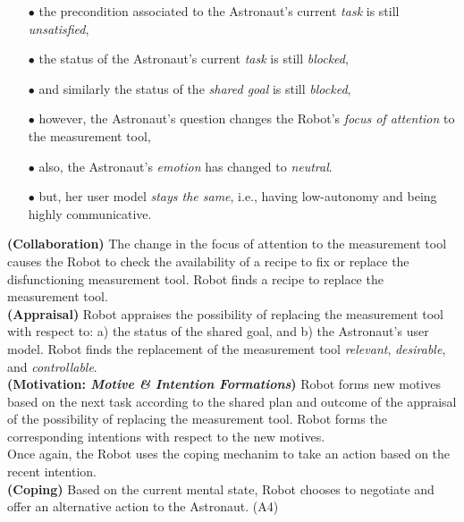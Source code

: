 \begin{itemize}
  \item[$\bullet$] the precondition associated to the Astronaut's current
  \textit{task} is still \textit{unsatisfied},
  \item[$\bullet$] the status of the Astronaut's current \textit{task} is still
  \textit{blocked},
  \item[$\bullet$] and similarly the status of the \textit{shared goal} is
  still \textit{blocked},
  \item[$\bullet$] however, the Astronaut's question changes the Robot's
  \textit{focus of attention} to the measurement tool,
  \item[$\bullet$] also, the Astronaut's \textit{emotion} has changed to
  \textit{neutral}.
  \item[$\bullet$] but, her user model \textit{stays the same}, i.e.,
  having low-autonomy and being highly communicative.
\end{itemize}

\noindent\textbf{(Collaboration)} The change in the focus of attention to the
measurement tool causes the Robot to check the availability of a recipe to fix
or replace the disfunctioning measurement tool. Robot finds a recipe to replace
the measurement tool.\\

\noindent\textbf{(Appraisal)} Robot appraises the possibility of
replacing the measurement tool with respect to: a) the status of the shared
goal, and b) the Astronaut's user model. Robot finds the replacement of the
measurement tool \textit{relevant}, \textit{desirable}, and
\textit{controllable}.\\

\noindent\textbf{(Motivation: \textit{Motive \& Intention Formations})} Robot
forms new motives based on the next task according to the shared plan and
outcome of the appraisal of the possibility of replacing the measurement tool.
Robot forms the corresponding intentions with respect to the new motives.\\

Once again, the Robot uses the coping mechanim to take an action based on the
recent intention.\\

\noindent\textbf{(Coping)} Based on the current mental state, Robot
chooses to negotiate and offer an alternative action to the Astronaut. (A4)\\

